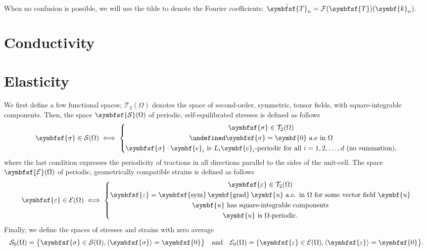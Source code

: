 \documentclass[draft, appendixprefix=true, chapterprefix=true, fontsize=12pt, numbers=noendperiod]{scrbook}
\let\div\undefined
\DeclareMathOperator{\div}{div}
\DeclareMathOperator{\grad}{\symbf{grad}}
\DeclareMathOperator{\sym}{\symbfsf{sym}}
\newcommand{\tens}[1]{\symbfsf{#1}}
\renewcommand{\vec}[1]{\symbf{#1}}
\newcommand{\tensors}{\mathcal T}
\newcommand{\stresses}{\mathcal S}
\newcommand{\strains}{\mathcal E}
\begin{document}
When no confusion is possible, we will use the tilde to denote the Fourier
coefficients: \(\tilde{\tens T}_n=\mathcal F(\tens T)(\vec k_n)\).

\section{Conductivity}

\section{Elasticity}

We first define a few functional spaces; \(\tensors_2(\Omega)\) denotes the
space of second-order, symmetric, tensor fields, with square-integrable
components. Then, the space \(\tens\stresses(\Omega)\) of periodic,
self-equilibrated stresses is defined as follows
\begin{equation}
  \label{eq:7}
  \tens\sigma\in\stresses(\Omega)\iff\left\{
  \begin{gathered}
    \tens\sigma\in\tensors_2(\Omega)\\
    \div\tens\sigma=\vec 0\text{ a.e in }\Omega\\
    \tens\sigma\cdot\vec e_i\text{ is }L_i\vec e_i\text{-periodic for all }i=1, 2, \ldots, d\text{ (no summation),}
  \end{gathered}
  \right.
\end{equation}
where the last condition expresses the periodicity of tractions in all
directions parallel to the sides of the unit-cell. The space
\(\tens\strains(\Omega)\) of periodic, geometrically compatible strains is
defined as follows
\begin{equation}
  \label{eq:8}
  \tens\varepsilon\in\strains(\Omega)\iff\left\{
  \begin{gathered}
    \tens\varepsilon\in\tensors_2(\Omega)\\
    \tens\varepsilon=\sym\grad\vec u\text{ a.e. in }\Omega\text{ for some vector
      field }\vec u\\
    \vec u\text{ has square-integrable components}\\
    \vec u\text{ is }\Omega\text{-periodic.}
  \end{gathered}
  \right.
\end{equation}
Finally, we define the spaces of stresses and strains with zero average
\begin{equation}
  \label{eq:9}
  \stresses_0(\Omega)=\bigl\{\tens\sigma\in\stresses(\Omega),
  \langle\tens\sigma\rangle=\tens0\bigr\}
  \quad\text{and}\quad
  \strains_0(\Omega)=\{\tens\varepsilon\in\strains(\Omega),
  \langle\tens\varepsilon\rangle=\tens0\bigr\}.
\end{equation}
\end{document}
